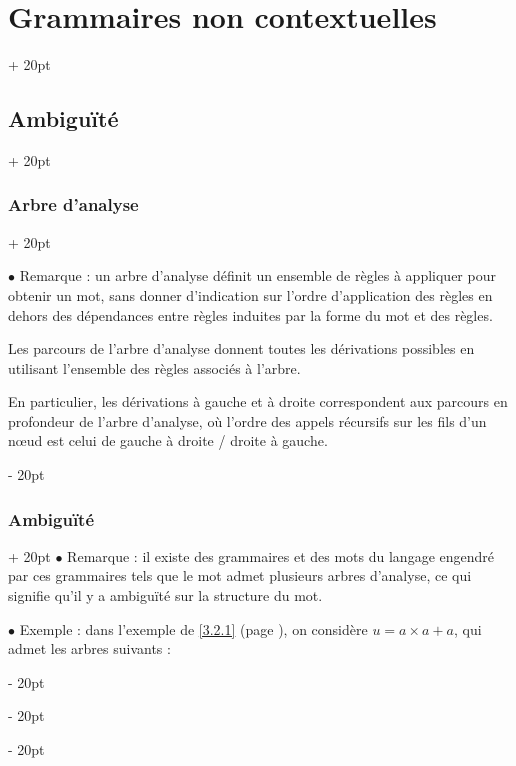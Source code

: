 \documentclass[a4paper, 12pt, twoside]{article}
\newcommand{\ind}[1][20pt]{\advance\leftskip + #1}
\newcommand{\deind}[1][20pt]{\advance\leftskip - #1}
\newenvironment{indt}[2][20pt]{#2 \par \ind[#1]}{\par \deind} %
\begin{document}
\begin{indt}{\section{Grammaires non contextuelles}}
\begin{indt}{\subsection{Ambiguïté}}
\begin{indt}{\subsubsection{Arbre d'analyse}}
                \vspace{12pt}
                
                $\bullet$ Remarque : un arbre d'analyse définit un ensemble de règles à appliquer pour obtenir un mot, sans donner d'indication sur l'ordre  d'application des règles en dehors des dépendances entre règles induites par la forme du mot et des règles.

                Les parcours de l'arbre d'analyse donnent toutes les dérivations possibles en utilisant l'ensemble des règles associés à l'arbre.

                En particulier, les dérivations à gauche et à droite correspondent aux parcours en profondeur de l'arbre d'analyse, où l'ordre des appels récursifs sur les fils d'un n\oe ud est celui de gauche à droite / droite à gauche.
            \end{indt}

            \vspace{12pt}
            
            \begin{indt}{\subsubsection{Ambiguïté}}
                $\bullet$ Remarque : il existe des grammaires et des mots du langage engendré par ces grammaires tels que le mot admet plusieurs arbres d'analyse, ce qui signifie qu'il y a ambiguïté sur la structure du mot.

                \vspace{12pt}
                
                $\bullet$ Exemple : dans l'exemple de \ref{3.2.1} (page \pageref{3.2.1}), on considère $u = a \times a + a$, qui admet les arbres suivants :
                
                \begin{center}
\end{center}
\end{indt}
\end{indt}
\end{indt}
\end{document}
